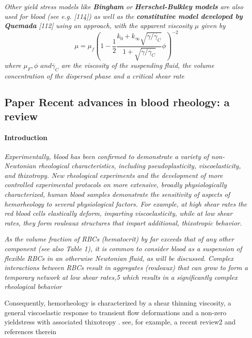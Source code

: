\documentclass[11pt,letterpaper]{article}
\begin{document}
\textit{Other yield stress models like {\color{red}\textbf{Bingham}} or {\color{red}\textbf{Herschel-Bulkley models}} are also used for blood (see e.g.
[114]) as well as the {\color{red}\textbf{constitutive model developed by Quemada}} [112] using an approach, with the apparent viscosity $\mu$ given by
\begin{equation}
    \mu = \mu_f (1 -\frac{1}{2}\frac{k_0+k_{\infty}\sqrt{\Dot{\gamma}/\Dot{\gamma_C}}}{1+\sqrt{\Dot{\gamma}/\Dot{\gamma_C}}}\phi)^{-2}
\end{equation}
where $\mu_F, \phi \hspace{4pt }and \Dot{\gamma_C}$ are the viscosity of the suspending fluid, the volume concentration of the dispersed phase and a critical shear rate
}



\subsection{Paper Recent advances in blood rheology: a review}

\paragraph{Introduction}
\textit{Experimentally, blood has been confirmed to demonstrate a variety of non-Newtonian rheological characteristics, including pseudoplasticity, viscoelasticity, and thixotropy. New rheological experiments and the development of more controlled experimental protocols on more extensive, broadly physiologically characterized, human blood samples demonstrate the sensitivity of aspects of hemorheology to several physiological factors. For example, at high shear rates the red blood cells elastically deform, imparting viscoelasticity, while at low shear rates, they form rouleaux structures that impart additional, thixotropic behavior.}

\textit{As the volume fraction of RBCs (hematocrit) by far exceeds that of any other component (see also Table 1), it is common to consider blood as a suspension of flexible RBCs in an otherwise Newtonian fluid, as will be discussed. Complex interactions between RBCs result in aggregates (rouleaux) that can grow to form a temporary network at low shear rates,5 which results in a significantly complex rheological behavior}


{\color{red} Consequently, hemorheology is characterized by a shear thinning viscosity, a general viscoelastic response to transient flow deformations and a non-zero yieldstress with associated
thixotropy . see, for example, a recent review2 and references therein}
\end{document}
